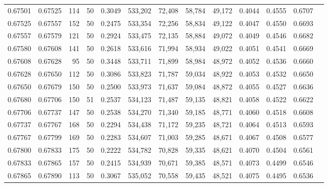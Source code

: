 \begin{tabular}{rrrrrrrrrrrrr}
0.67501 & 0.67525 &   114 &  50 &                                     0.3049 & 533,202 &  72,408 &  58,784 &  49,172 & 0.4044 & 0.4555 & 0.6707 \\
0.67525 & 0.67557 &   152 &  50 &                                     0.2475 & 533,354 &  72,256 &  58,834 &  49,122 & 0.4047 & 0.4550 & 0.6693 \\
0.67557 & 0.67579 &   121 &  50 &                                     0.2924 & 533,475 &  72,135 &  58,884 &  49,072 & 0.4049 & 0.4546 & 0.6682 \\
0.67580 & 0.67608 &   141 &  50 &                                     0.2618 & 533,616 &  71,994 &  58,934 &  49,022 & 0.4051 & 0.4541 & 0.6669 \\
0.67608 & 0.67628 &    95 &  50 &                                     0.3448 & 533,711 &  71,899 &  58,984 &  48,972 & 0.4052 & 0.4536 & 0.6660 \\
0.67628 & 0.67650 &   112 &  50 &                                     0.3086 & 533,823 &  71,787 &  59,034 &  48,922 & 0.4053 & 0.4532 & 0.6650 \\
0.67650 & 0.67679 &   150 &  50 &                                     0.2500 & 533,973 &  71,637 &  59,084 &  48,872 & 0.4055 & 0.4527 & 0.6636 \\
0.67680 & 0.67706 &   150 &  51 &                                     0.2537 & 534,123 &  71,487 &  59,135 &  48,821 & 0.4058 & 0.4522 & 0.6622 \\
0.67706 & 0.67737 &   147 &  50 &                                     0.2538 & 534,270 &  71,340 &  59,185 &  48,771 & 0.4060 & 0.4518 & 0.6608 \\
0.67737 & 0.67767 &   168 &  50 &                                     0.2294 & 534,438 &  71,172 &  59,235 &  48,721 & 0.4064 & 0.4513 & 0.6593 \\
0.67767 & 0.67799 &   169 &  50 &                                     0.2283 & 534,607 &  71,003 &  59,285 &  48,671 & 0.4067 & 0.4508 & 0.6577 \\
0.67800 & 0.67833 &   175 &  50 &                                     0.2222 & 534,782 &  70,828 &  59,335 &  48,621 & 0.4070 & 0.4504 & 0.6561 \\
0.67833 & 0.67865 &   157 &  50 &                                     0.2415 & 534,939 &  70,671 &  59,385 &  48,571 & 0.4073 & 0.4499 & 0.6546 \\
0.67865 & 0.67890 &   113 &  50 &                                     0.3067 & 535,052 &  70,558 &  59,435 &  48,521 & 0.4075 & 0.4495 & 0.6536 \\

\end{tabular}
